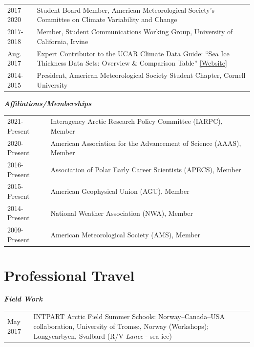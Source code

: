 \documentclass[margin,line,palatino,courier,10pt]{res}
\begin{document}
\begin{resume}
\begin{tabular}{@{}p{0.9in}p{4in}}
2017-2020 & Student Board Member, American Meteorological Society's Committee on Climate Variability and Change\\
2017-2018 & Member, Student Communications Working Group, University of California, Irvine\\
Aug. 2017 & Expert Contributor to the UCAR Climate Data Guide: ``Sea Ice Thickness Data Sets: Overview \& Comparison Table'' \href{https://climatedataguide.ucar.edu/climate-data/sea-ice-thickness-data-sets-overview-comparison-table}{[Website]}\\
2014-2015 & President, American Meteorological Society Student Chapter, Cornell University\\
\end{tabular}

\textit{\textbf{Affiliations/Memberships}}
\vspace*{0.05in}\\
\begin{tabular}{@{}p{0.9in}p{4in}}
2021-Present & Interagency Arctic Research Policy Committee (IARPC), Member\\
2020-Present & American Association for the Advancement of Science (AAAS), Member\\
2016-Present & Association of Polar Early Career Scientists (APECS), Member\\ 
2015-Present & American Geophysical Union (AGU), Member\\
2014-Present & National Weather Association (NWA), Member\\
2009-Present & American Meteorological Society (AMS), Member\\
\end{tabular}
\section{\sc \textcolor{Cerulean}{\large{\textbf{Professional Travel}}}}
\textit{\textbf{Field Work}}
\vspace*{0.05in}\\
\begin{tabular}{@{}p{0.9in}p{4in}}
May 2017 & INTPART Arctic Field Summer Schools: Norway--Canada--USA collaboration, University of Troms\o, Norway (Workshops); Longyearbyen, Svalbard (R/V \textit{Lance} - sea ice)
\end{tabular}


\end{resume}
\end{document}
